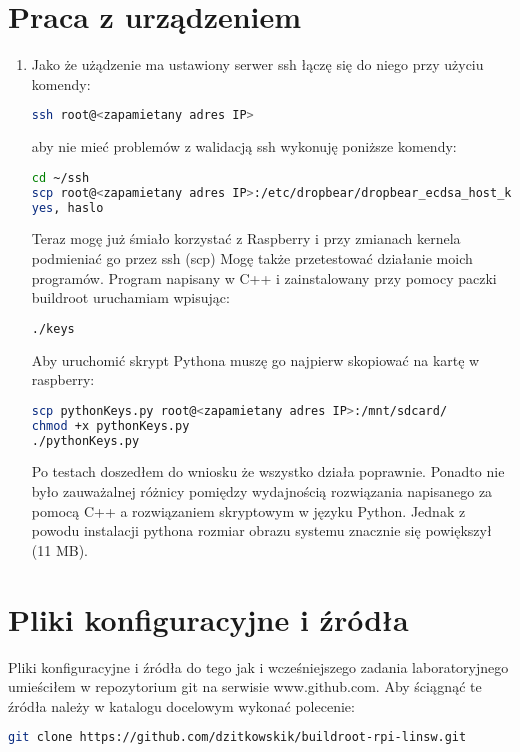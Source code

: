 \section{Praca z urządzeniem}
\begin{enumerate}
\item Jako że użądzenie ma ustawiony serwer ssh łączę się do niego przy użyciu komendy:
\begin{lstlisting}[language=bash]
ssh root@<zapamietany adres IP>
\end{lstlisting}
aby nie mieć problemów z walidacją ssh wykonuję poniższe komendy:
\begin{lstlisting}[language=bash]
cd ~/ssh
scp root@<zapamietany adres IP>:/etc/dropbear/dropbear_ecdsa_host_key ./
yes, haslo
\end{lstlisting}
Teraz mogę już śmiało korzystać z Raspberry i przy zmianach kernela podmieniać go przez ssh (scp)
Mogę także przetestować działanie moich programów. Program napisany w C++ i zainstalowany przy pomocy
paczki buildroot uruchamiam wpisując:
\begin{lstlisting}[language=bash]
./keys
\end{lstlisting}
Aby uruchomić skrypt Pythona muszę go najpierw skopiować na kartę w raspberry:
\begin{lstlisting}[language=bash]
scp pythonKeys.py root@<zapamietany adres IP>:/mnt/sdcard/
chmod +x pythonKeys.py
./pythonKeys.py
\end{lstlisting}
Po testach doszedłem do wniosku że wszystko działa poprawnie. Ponadto nie było zauważalnej różnicy
pomiędzy wydajnością rozwiązania napisanego za pomocą C++ a rozwiązaniem skryptowym w języku Python.
Jednak z powodu instalacji pythona rozmiar obrazu systemu znacznie się powiększył (11 MB).
\end{enumerate}

\section{Pliki konfiguracyjne i źródła}
Pliki konfiguracyjne i źródła do tego jak i wcześniejszego zadania laboratoryjnego umieściłem w repozytorium
git na serwisie www.github.com. Aby ściągnąć te źródła należy w katalogu docelowym wykonać polecenie:
\begin{lstlisting}[language=bash]
git clone https://github.com/dzitkowskik/buildroot-rpi-linsw.git
\end{lstlisting}	

